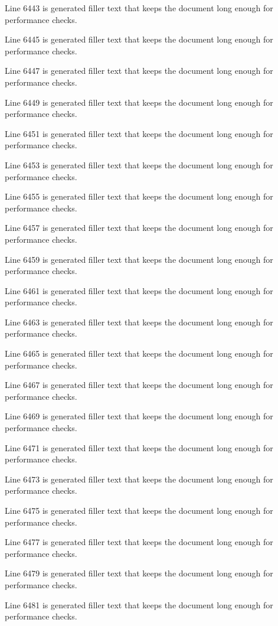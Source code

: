 Line 6443 is generated filler text that keeps the document long enough for performance checks.

Line 6445 is generated filler text that keeps the document long enough for performance checks.

Line 6447 is generated filler text that keeps the document long enough for performance checks.

Line 6449 is generated filler text that keeps the document long enough for performance checks.

Line 6451 is generated filler text that keeps the document long enough for performance checks.

Line 6453 is generated filler text that keeps the document long enough for performance checks.

Line 6455 is generated filler text that keeps the document long enough for performance checks.

Line 6457 is generated filler text that keeps the document long enough for performance checks.

Line 6459 is generated filler text that keeps the document long enough for performance checks.

Line 6461 is generated filler text that keeps the document long enough for performance checks.

Line 6463 is generated filler text that keeps the document long enough for performance checks.

Line 6465 is generated filler text that keeps the document long enough for performance checks.

Line 6467 is generated filler text that keeps the document long enough for performance checks.

Line 6469 is generated filler text that keeps the document long enough for performance checks.

Line 6471 is generated filler text that keeps the document long enough for performance checks.

Line 6473 is generated filler text that keeps the document long enough for performance checks.

Line 6475 is generated filler text that keeps the document long enough for performance checks.

Line 6477 is generated filler text that keeps the document long enough for performance checks.

Line 6479 is generated filler text that keeps the document long enough for performance checks.

Line 6481 is generated filler text that keeps the document long enough for performance checks.

